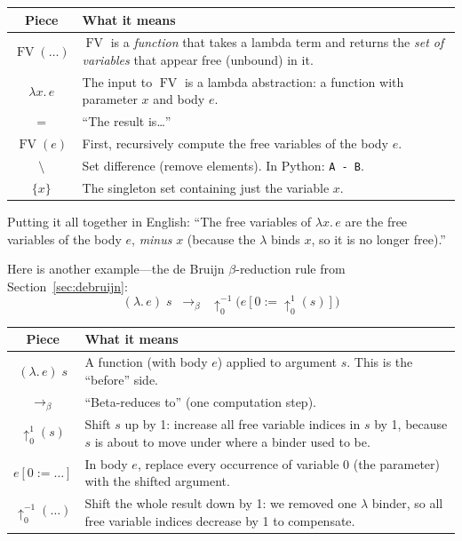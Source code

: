 \documentclass[11pt,a4paper]{article}
\theoremstyle{definition}
\newcommand{\lam}{\lambda}
\newcommand{\reduce}{\longrightarrow_\beta}
\newcommand{\FV}{\operatorname{FV}}
\begin{document}
\begin{center}
\renewcommand{\arraystretch}{1.6}
\begin{tabular}{cp{10.5cm}}
\textbf{Piece} & \textbf{What it means} \\
\hline
$\FV(\ldots)$ &
  $\FV$ is a \emph{function} that takes a lambda term and returns the
  \emph{set of variables} that appear free (unbound) in it. \\

$\lam x.\, e$ &
  The input to $\FV$ is a lambda abstraction: a function with parameter $x$
  and body $e$. \\

$=$ &
  ``The result is\ldots'' \\

$\FV(e)$ &
  First, recursively compute the free variables of the body $e$. \\

$\setminus$ &
  Set difference (remove elements). In Python: \texttt{A - B}. \\

$\{x\}$ &
  The singleton set containing just the variable $x$. \\
\end{tabular}
\end{center}

\medskip\noindent
Putting it all together in English: ``The free variables of $\lam x.\, e$
are the free variables of the body $e$, \emph{minus} $x$ (because the
$\lam$ binds $x$, so it is no longer free).''

\medskip\noindent
Here is another example---the de Bruijn $\beta$-reduction rule from
Section~\ref{sec:debruijn}:
\[
  (\lam.\, e)\; s \;\;\reduce\;\; \uparrow^{-1}_0\!\bigl(e[0 := \uparrow^1_0(s)]\bigr)
\]

\begin{center}
\renewcommand{\arraystretch}{1.6}
\begin{tabular}{cp{10.5cm}}
\textbf{Piece} & \textbf{What it means} \\
\hline
$(\lam.\, e)\; s$ &
  A function (with body $e$) applied to argument $s$.
  This is the ``before'' side. \\

$\reduce$ &
  ``Beta-reduces to'' (one computation step). \\

$\uparrow^1_0(s)$ &
  Shift $s$ up by 1: increase all free variable indices in $s$ by 1,
  because $s$ is about to move under where a binder used to be. \\

$e[0 := \ldots]$ &
  In body $e$, replace every occurrence of variable 0 (the parameter)
  with the shifted argument. \\

$\uparrow^{-1}_0(\ldots)$ &
  Shift the whole result down by 1: we removed one $\lam$ binder,
  so all free variable indices decrease by 1 to compensate. \\
\end{tabular}
\end{center}
\end{document}
